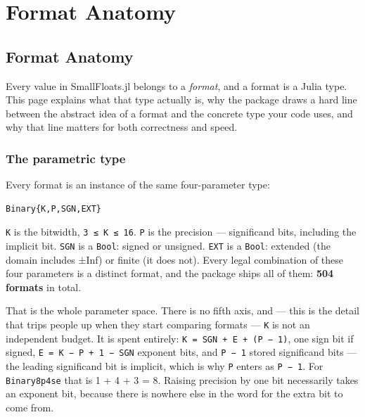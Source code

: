 \chapter{Format Anatomy}


\section{Format Anatomy}



\label{14370471873176541345}{}


Every value in SmallFloats.jl belongs to a \emph{format}, and a format is a Julia type. This page explains what that type actually is, why the package draws a hard line between the abstract idea of a format and the concrete type your code uses, and why that line matters for both correctness and speed.



\subsection{The parametric type}



\label{13610640477998426652}{}


Every format is an instance of the same four-parameter type:




\nopagebreak[4]
\begin{verbatim}
Binary{K,P,SGN,EXT}
\end{verbatim}



\texttt{K} is the bitwidth, \texttt{3 ≤ K ≤ 16}. \texttt{P} is the precision — significand bits, including the implicit bit. \texttt{SGN} is a \texttt{Bool}: signed or unsigned. \texttt{EXT} is a \texttt{Bool}: extended (the domain includes ±Inf) or finite (it does not). Every legal combination of these four parameters is a distinct format, and the package ships all of them: \textbf{504 formats} in total.



That is the whole parameter space. There is no fifth axis, and — this is the detail that trips people up when they start comparing formats — \texttt{K} is not an independent budget. It is spent entirely: \texttt{K = SGN + E + (P − 1)}, one sign bit if signed, \texttt{E = K − P + 1 − SGN} exponent bits, and \texttt{P − 1} stored significand bits — the leading significand bit is implicit, which is why \texttt{P} enters as \texttt{P − 1}. For \texttt{Binary8p4se} that is 1 + 4 + 3 = 8. Raising precision by one bit necessarily takes an exponent bit, because there is nowhere else in the word for the extra bit to come from.



